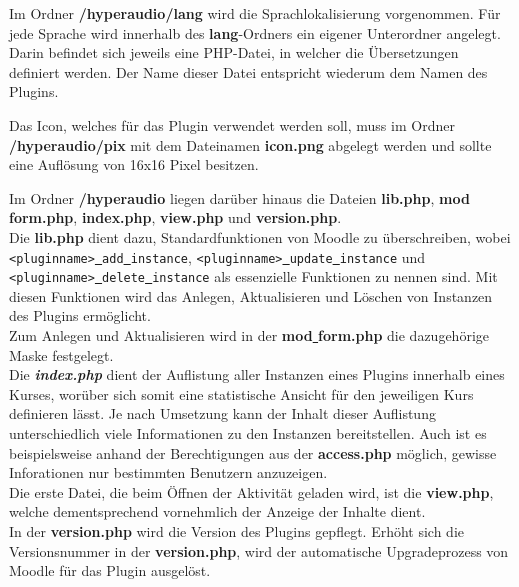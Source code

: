 Im Ordner \textbf{/hyperaudio/lang} wird die Sprachlokalisierung vorgenommen. Für jede Sprache wird innerhalb des \textbf{lang}-Ordners ein eigener Unterordner angelegt. Darin befindet sich jeweils eine PHP-Datei, in welcher die Übersetzungen definiert werden. Der Name dieser Datei entspricht wiederum dem Namen des Plugins.

Das Icon, welches für das Plugin  verwendet werden soll, muss im Ordner \textbf{/hyperaudio/pix} mit dem Dateinamen \textbf{icon.png} abgelegt werden und sollte eine Auflösung von 16x16 Pixel besitzen.

Im Ordner \textbf{/hyperaudio} liegen darüber hinaus die Dateien \textbf{lib.php}, \textbf{mod\underline{{ }}form.php}, \textbf{index.php}, \textbf{view.php} und \textbf{version.php}.\\
Die \textbf{lib.php} dient dazu, Standardfunktionen von Moodle zu überschreiben, wobei \mbox{\texttt{<pluginname>\underline{{ }}add\underline{{ }}instance}}, \texttt{<pluginname>\underline{{ }}update\underline{{ }}instance} und \texttt{<pluginname>\underline{{ }}delete\underline{{ }}instance} als essenzielle Funktionen zu nennen sind. Mit diesen Funktionen wird das Anlegen, Aktualisieren und Löschen von Instanzen des Plugins ermöglicht.\\
Zum Anlegen und Aktualisieren wird in der \textbf{mod\underline{{ }}form.php} die dazugehörige Maske festgelegt.\\
Die \textbf{\textit{index.php}} dient der Auflistung aller Instanzen eines Plugins innerhalb eines Kurses, worüber sich somit eine statistische Ansicht für den jeweiligen Kurs definieren lässt. Je nach Umsetzung kann der Inhalt dieser Auflistung unterschiedlich viele Informationen zu den Instanzen bereitstellen. Auch ist es beispielsweise anhand der Berechtigungen aus der \textbf{access.php} möglich, gewisse Inforationen nur bestimmten Benutzern anzuzeigen.\\
Die erste Datei, die beim Öffnen der Aktivität geladen wird, ist die \textbf{view.php}, welche dementsprechend vornehmlich der Anzeige der Inhalte dient.\\
In der \textbf{version.php} wird die Version des Plugins gepflegt. Erhöht sich die Versionsnummer in der \textbf{version.php}, wird der automatische Upgradeprozess von Moodle für das Plugin ausgelöst.

